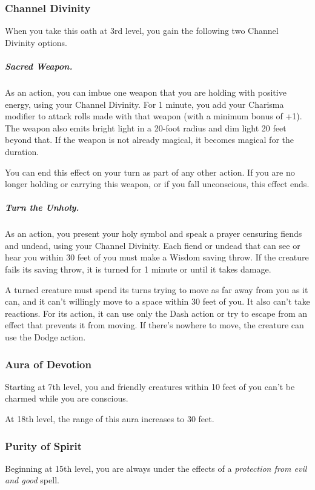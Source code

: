 \subsubsection{Channel Divinity}

When you take this oath at 3rd level, you gain the following two Channel Divinity options.

\subparagraph*{Sacred Weapon.} As an action, you can imbue one weapon that you are holding with positive energy, using your Channel Divinity. For 1 minute, you add your Charisma modifier to attack rolls made with that weapon (with a minimum bonus of +1). The weapon also emits bright light in a 20-foot radius and dim light 20 feet beyond that. If the weapon is not already magical, it becomes magical for the duration.

You can end this effect on your turn as part of any other action. If you are no longer holding or carrying this weapon, or if you fall unconscious, this effect ends.

\subparagraph*{Turn the Unholy.} As an action, you present your holy symbol and speak a prayer censuring fiends and undead, using your Channel Divinity. Each fiend or undead that can see or hear you within 30 feet of you must make a Wisdom saving throw. If the creature fails its saving throw, it is turned for 1 minute or until it takes damage.

A turned creature must spend its turns trying to move as far away from you as it can, and it can't willingly move to a space within 30 feet of you. It also can't take reactions. For its action, it can use only the Dash action or try to escape from an effect that prevents it from moving. If there's nowhere to move, the creature can use the Dodge action.

\subsubsection{Aura of Devotion}

Starting at 7th level, you and friendly creatures within 10 feet of you can't be charmed while you are conscious.

At 18th level, the range of this aura increases to 30 feet.

\subsubsection{Purity of Spirit}

Beginning at 15th level, you are always under the effects of a \textit{protection from evil and good} spell.

